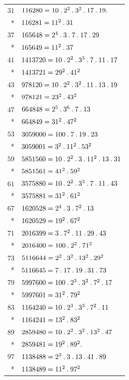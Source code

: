 \par{}%
\begingroup\renewcommand{\arraystretch}{1.08}
\begin{longtable}{@{}rl@{}}
$31$ & $116280=10\mathbin{.} 2^{2}\mathbin{.} 3^{2}\mathbin{.} 17\mathbin{.} 19\mathbin{.}$\\*
 & $116281=11^{2}\mathbin{.} 31$\\
$37$ & $165648=2^{4}\mathbin{.} 3\mathbin{.} 7\mathbin{.} 17\mathbin{.} 29$\\*
 & $165649=11^{2}\mathbin{.} 37$\\
$41$ & $1413720=10\mathbin{.} 2^{2}\mathbin{.} 3^{3}\mathbin{.} 7\mathbin{.} 11\mathbin{.} 17$\\*
 & $1413721=29^{2}\mathbin{.} 41^{2}$\\
$43$ & $978120=10\mathbin{.} 2^{2}\mathbin{.} 3^{2}\mathbin{.} 11\mathbin{.} 13\mathbin{.} 19$\\*
 & $978121=23^{2}\mathbin{.} 43^{2}$\\
$47$ & $664848=2^{5}\mathbin{.} 3^{6}\mathbin{.} 7\mathbin{.} 13$\\*
 & $664849=31^{2}\mathbin{.} 47^{2}$\\
$53$ & $3059000=100\mathbin{.} 7\mathbin{.} 19\mathbin{.} 23$\\*
 & $3059001=3^{2}\mathbin{.} 11^{2}\mathbin{.} 53^{2}$\\
$59$ & $5851560=10\mathbin{.} 2^{2}\mathbin{.} 3\mathbin{.} 11^{2}\mathbin{.} 13\mathbin{.} 31$\\*
 & $5851561=41^{2}\mathbin{.} 59^{2}$\\
$61$ & $3575880=10\mathbin{.} 2^{2}\mathbin{.} 3^{3}\mathbin{.} 7\mathbin{.} 11\mathbin{.} 43$\\*
 & $3575881=31^{2}\mathbin{.} 61^{2}$\\
$67$ & $1620528=2^{4}\mathbin{.} 3\mathbin{.} 7^{2}\mathbin{.} 13$\\*
 & $1620529=19^{2}\mathbin{.} 67^{2}$\\
$71$ & $2016399=3\mathbin{.} 7^{2}\mathbin{.} 11\mathbin{.} 29\mathbin{.} 43$\\*
 & $2016400=100\mathbin{.} 2^{2}\mathbin{.} 71^{2}$\\
$73$ & $5116644=2^{2}\mathbin{.} 3^{2}\mathbin{.} 13^{2}\mathbin{.} 29^{2}$\\*
 & $5116645=7\mathbin{.} 17\mathbin{.} 19\mathbin{.} 31\mathbin{.} 73$\\
$79$ & $5997600=100\mathbin{.} 2^{3}\mathbin{.} 3^{2}\mathbin{.} 7^{2}\mathbin{.} 17$\\*
 & $5997601=31^{2}\mathbin{.} 79^{2}$\\
$83$ & $1164240=10\mathbin{.} 2^{3}\mathbin{.} 3^{3}\mathbin{.} 7^{2}\mathbin{.} 11$\\*
 & $1164241=13^{2}\mathbin{.} 83^{2}$\\
$89$ & $2859480=10\mathbin{.} 2^{2}\mathbin{.} 3^{2}\mathbin{.} 13^{2}\mathbin{.} 47$\\*
 & $2859481=19^{2}\mathbin{.} 89^{2}\mathbin{.}$\\
$97$ & $1138488=2^{3}\mathbin{.} 3\mathbin{.} 13\mathbin{.} 41\mathbin{.} 89$\\*
 & $1138489=11^{2}\mathbin{.} 97^{2}$\\
\end{longtable}\endgroup
